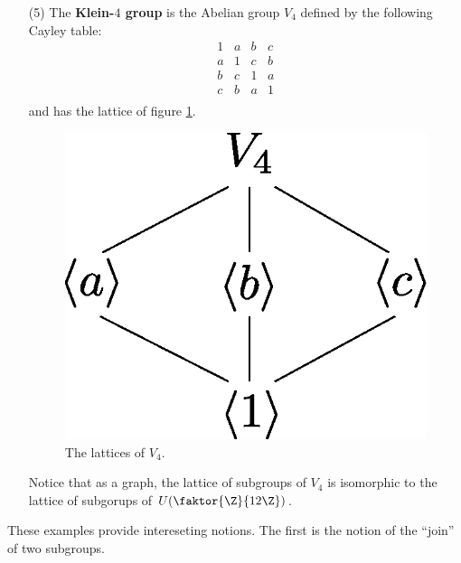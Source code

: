 \begin{example}
\begin{enumerate}
        \item[(5)] The \textbf{Klein-$4$ group} is the Abelian group $V_4$
            defined by the following Cayley table:
            \begin{equation*}
                \begin{matrix}
                    1 & a & b & c \\
                    a & 1 & c & b \\
                    b & c & 1 & a \\
                    c & b & a & 1 \\
                \end{matrix}
            \end{equation*}
            and has the lattice of figure \ref{fig_2.5}.
            \begin{figure}[h]
                \centering
                \includegraphics[scale = 0.5]{Figures/Chapter2/V_4_lattice.eps}
                \caption{The lattices of $V_4$.}
                \label{fig_2.5}
            \end{figure}
            Notice that as a graph, the lattice of subgroups of $V_4$ is
            isomorphic to the lattice of subgorups of $U(\faktor{\Z}{12\Z})$.
    \end{enumerate}
\end{example}

These examples provide intereseting notions. The first is the notion of the
``join'' of two subgroups.

